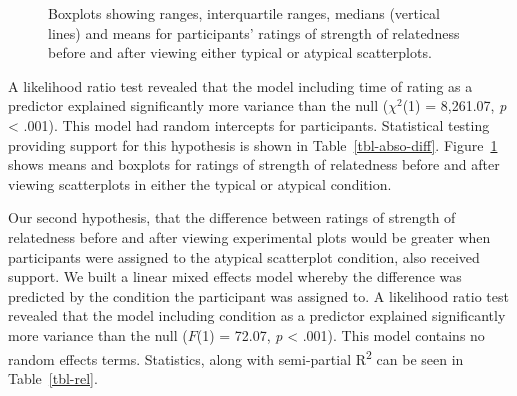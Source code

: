 \documentclass[manuscript,screen,review]{acmart}
\begin{document}
\begin{figure}


\caption{\label{fig-abso-descriptives}Boxplots showing ranges,
interquartile ranges, medians (vertical lines) and means for
participants' ratings of strength of relatedness before and after
viewing either typical or atypical scatterplots.}

\end{figure}%

A likelihood ratio test revealed that the model including time of rating
as a predictor explained significantly more variance than the null
(\(\chi^2\)(1) = 8,261.07, \emph{p} \textless{} .001). This model had
random intercepts for participants. Statistical testing providing
support for this hypothesis is shown in Table~\ref{tbl-abso-diff}.
Figure~\ref{fig-abso-descriptives} shows means and boxplots for ratings
of strength of relatedness before and after viewing scatterplots in
either the typical or atypical condition.

Our second hypothesis, that the difference between ratings of strength
of relatedness before and after viewing experimental plots would be
greater when participants were assigned to the atypical scatterplot
condition, also received support. We built a linear mixed effects model
whereby the difference was predicted by the condition the participant
was assigned to. A likelihood ratio test revealed that the model
including condition as a predictor explained significantly more variance
than the null (\(F\)(1) = 72.07, \emph{p} \textless{} .001). This model
contains no random effects terms. Statistics, along with semi-partial
R\textsuperscript{2} can be seen in Table~\ref{tbl-rel}.
\end{document}
